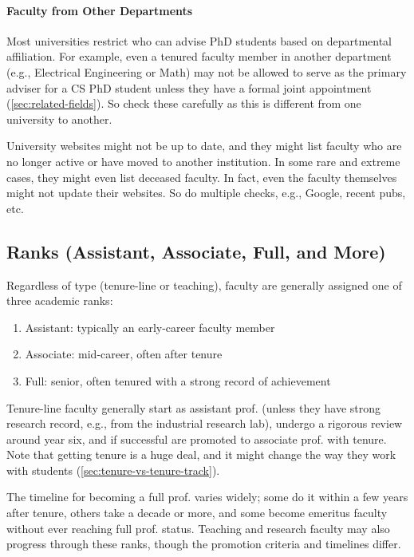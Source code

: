 \documentclass[oneside,11pt]{book}
\newenvironment{warningbox}[1][]{
  \small
  \begin{marker}[\faChessKing{}]
    {\textbf{#1}}
  }{
  \end{marker}
}
\begin{document}
\paragraph{Faculty from Other Departments}

Most universities restrict who can advise PhD students based on departmental affiliation. For example, even a tenured faculty member in another department (e.g., Electrical Engineering or Math) may not be allowed to serve as the primary adviser for a CS PhD student unless they have a formal joint appointment (\autoref{sec:related-fields}). 
So check these carefully as this is different from one university to another.

\begin{warningbox}
University websites might not be up to date, and they might list faculty who are no longer active or have moved to another institution. In some rare and extreme cases, they might even list deceased faculty.  In fact, even the faculty themselves might not update their websites. So do multiple checks, e.g., Google, recent pubs, etc.
\end{warningbox}


\subsection{Ranks (Assistant, Associate, Full, and More)} 

Regardless of type (tenure-line or teaching), faculty are generally assigned one of three academic ranks:
\begin{enumerate}
    \item Assistant: typically an early-career faculty member
    \item Associate: mid-career, often after tenure
    \item Full: senior, often tenured with a strong record of achievement
\end{enumerate}

Tenure-line faculty generally start as assistant prof. (unless they have strong research record, e.g., from the industrial research lab), undergo a rigorous review around year six, and if successful are promoted to associate prof. with tenure. Note that getting tenure is a huge deal, and it might change the way they work with students (\autoref{sec:tenure-vs-tenure-track}).

The timeline for becoming a full prof. varies widely; some do it within a few years after tenure, others take a decade or more, and some become emeritus faculty without ever reaching full prof. status.  Teaching and research faculty may also progress through these ranks, though the promotion criteria and timelines differ.
\end{document}
